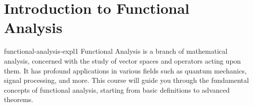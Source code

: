 \documentclass[preview]{standalone}
\begin{document}
\genpage

\section{Introduction to Functional Analysis}

\begin{snippet}{functional-analysis-expl1}
    Functional Analysis is a branch of mathematical analysis, concerned with the study of vector spaces and operators acting upon them. It has profound applications in various fields such as quantum mechanics, signal processing, and more. This course will guide you through the fundamental concepts of functional analysis, starting from basic definitions to advanced theorems.
\end{snippet}
\end{document}
